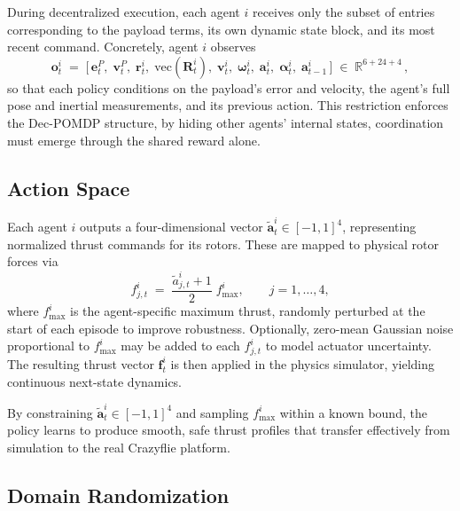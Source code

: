 During decentralized execution, each agent \(i\) receives only the subset of entries corresponding to the payload terms, its own dynamic state block, and its most recent command.  Concretely, agent \(i\) observes
\[
\mathbf{o}^i_t 
\;=\;
\bigl[\,
\mathbf{e}^P_t,\;\mathbf{v}^P_t,\;\mathbf{r}^i_t,\;\mathrm{vec}(\mathbf{R}^i_t),\;\mathbf{v}^i_t,\;\boldsymbol{\omega}^i_t,\;\mathbf{a}^i_t,\;\boldsymbol{\alpha}^i_t,\;\mathbf{a}^i_{t-1}
\,\bigr]\;\in\;\mathbb{R}^{6 + 24 + 4}\,,
\]
so that each policy conditions on the payload's error and velocity, the agent's full pose and inertial measurements, and its previous action.  This restriction enforces the Dec-POMDP structure, by hiding other agents' internal states, coordination must emerge through the shared reward alone.

\subsection{Action Space}

Each agent \(i\) outputs a four-dimensional vector \(\tilde{\mathbf{a}}^i_t\in[-1,1]^4\), representing normalized thrust commands for its rotors.  These are mapped to physical rotor forces via
\[
f^i_{j,t}
\;=\;
\frac{\tilde{a}^i_{j,t} + 1}{2}\;f_{\max}^i,
\qquad
j=1,\dots,4,
\]
where \(f_{\max}^i\) is the agent-specific maximum thrust, randomly perturbed at the start of each episode to improve robustness.  Optionally, zero-mean Gaussian noise proportional to \(f_{\max}^i\) may be added to each \(f^i_{j,t}\) to model actuator uncertainty.  The resulting thrust vector \(\mathbf{f}^i_t\) is then applied in the physics simulator, yielding continuous next-state dynamics.  

By constraining \(\tilde{\mathbf{a}}^i_t\in[-1,1]^4\) and sampling \(f_{\max}^i\) within a known bound, the policy learns to produce smooth, safe thrust profiles that transfer effectively from simulation to the real Crazyflie platform.  
\subsection{Domain Randomization}
